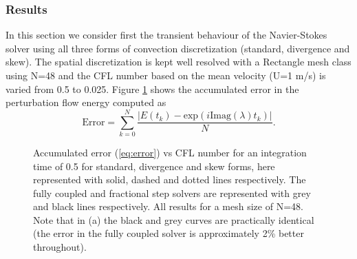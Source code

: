 \subsubsection{Results}
In this section we consider first the transient behaviour of the Navier-Stokes solver using all three forms of convection discretization (standard, divergence and skew). The spatial discretization is kept well resolved with a Rectangle mesh class using N=48 and the CFL number based on the mean velocity (U=1 m/s) is varied from 0.5 to 0.025. Figure \ref{fig:OS_init_cfl}  shows the accumulated error in the perturbation flow energy computed as
\begin{equation}
 \text{Error} = \sum_{k=0}^N \frac{|E(t_k)-\text{exp}(i \text{Imag}(\lambda) t_k)|}{N}.
 \label{eq:error}
\end{equation}
\begin{figure}
 \centering
 \caption{Accumulated error (\ref{eq:error}) vs CFL number for an integration time of 0.5 for standard, divergence and skew forms, here represented with solid, dashed and dotted lines respectively. The fully coupled and fractional step solvers are represented with grey and black lines respectively. All results for a mesh size of N=48. Note that in (a) the black and grey curves are practically identical (the error in the fully coupled solver is approximately 2\% better throughout).}
\label{fig:OS_init_cfl}
\end{figure}
